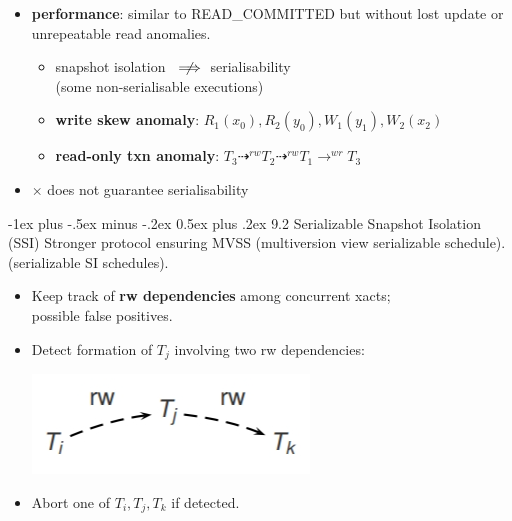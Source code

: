 \documentclass[10pt, landscape]{article}
\makeatletter
\renewcommand{\section}{\@startsection{section}{1}{0mm}%
                                {-1ex plus -.5ex minus -.2ex}%
                                {0.5ex plus .2ex}%
                                {\normalfont\large\bfseries}}
\makeatother
\begin{document}
\begin{multicols*}{3}
\begin{itemize}
\item \textbf{performance}: similar to READ\_COMMITTED but without lost update or unrepeatable read anomalies.
	\begin{itemize}
	\item snapshot isolation $\rlap{\(\quad\not\)}\implies$ serialisability \\
 (some non-serialisable executions)
	\item \textbf{write skew anomaly}: $R_1(x_0), R_2(y_0), W_1(y_1), W_2(x_2)$
	\item \textbf{read-only txn anomaly}: $T_3 \dashrightarrow^{rw} T_2 \dashrightarrow^{rw} T_1 \rightarrow^{wr} T_3$ 
	\end{itemize}
\item $\times$ does not guarantee serialisability
\end{itemize}

\section{9.2 Serializable Snapshot Isolation (SSI)}
Stronger protocol ensuring MVSS (multiversion view serializable schedule). (serializable SI schedules).
\begin{itemize}
\item Keep track of \textbf{rw dependencies} among concurrent xacts; \\
	 possible false positives.
\item Detect formation of $T_j$ involving two rw dependencies:
\centerline{\includegraphics[width = 0.2\linewidth]{rw}}
\item Abort one of $T_i, T_j, T_k$ if detected.
\end{itemize}


\end{multicols*}
\end{document}
